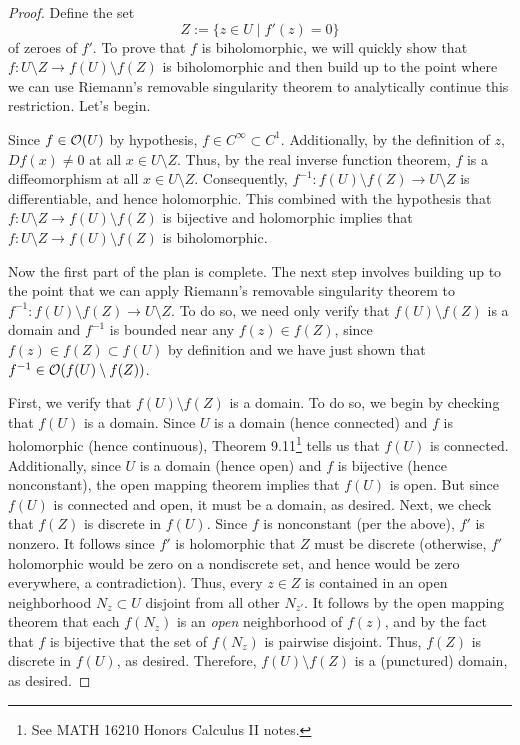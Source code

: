 \documentclass[../notes.tex]{subfiles}
\begin{document}
\begin{itemize}
\begin{enumerate}
\begin{proof}
            Define the set
            \begin{equation*}
                Z := \{z\in U\mid f'(z)=0\}
            \end{equation*}
            of zeroes of $f'$. To prove that $f$ is biholomorphic, we will quickly show that $f:U\setminus Z\to f(U)\setminus f(Z)$ is biholomorphic and then build up to the point where we can use Riemann's removable singularity theorem to analytically continue this restriction. Let's begin.\par
            Since $f\in\mathcal{O}(U)$ by hypothesis, $f\in C^\infty\subset C^1$. Additionally, by the definition of $z$, $Df(x)\neq 0$ at all $x\in U\setminus Z$. Thus, by the real inverse function theorem, $f$ is a diffeomorphism at all $x\in U\setminus Z$. Consequently, $f^{-1}:f(U)\setminus f(Z)\to U\setminus Z$ is differentiable, and hence holomorphic. This combined with the hypothesis that $f:U\setminus Z\to f(U)\setminus f(Z)$ is bijective and holomorphic implies that $f:U\setminus Z\to f(U)\setminus f(Z)$ is biholomorphic.\par
            Now the first part of the plan is complete. The next step involves building up to the point that we can apply Riemann's removable singularity theorem to $f^{-1}:f(U)\setminus f(Z)\to U\setminus Z$. To do so, we need only verify that $f(U)\setminus f(Z)$ is a domain and $f^{-1}$ is bounded near any $f(z)\in f(Z)$, since $f(z)\in f(Z)\subset f(U)$ by definition and we have just shown that $f^{-1}\in\mathcal{O}(f(U)\setminus f(Z))$.\par
            First, we verify that $f(U)\setminus f(Z)$ is a domain. To do so, we begin by checking that $f(U)$ is a domain. Since $U$ is a domain (hence connected) and $f$ is holomorphic (hence continuous), Theorem 9.11\footnote{See MATH 16210 Honors Calculus II notes.} tells us that $f(U)$ is connected. Additionally, since $U$ is a domain (hence open) and $f$ is bijective (hence nonconstant), the open mapping theorem implies that $f(U)$ is open. But since $f(U)$ is connected and open, it must be a domain, as desired. Next, we check that $f(Z)$ is discrete in $f(U)$. Since $f$ is nonconstant (per the above), $f'$ is nonzero. It follows since $f'$ is holomorphic that $Z$ must be discrete (otherwise, $f'$ holomorphic would be zero on a nondiscrete set, and hence would be zero everywhere, a contradiction). Thus, every $z\in Z$ is contained in an open neighborhood $N_z\subset U$ disjoint from all other $N_{z'}$. It follows by the open mapping theorem that each $f(N_z)$ is an \emph{open} neighborhood of $f(z)$, and by the fact that $f$ is bijective that the set of $f(N_z)$ is pairwise disjoint. Thus, $f(Z)$ is discrete in $f(U)$, as desired. Therefore, $f(U)\setminus f(Z)$ is a (punctured) domain, as desired.\par

\end{proof}
\end{enumerate}
\end{itemize}
\end{document}
